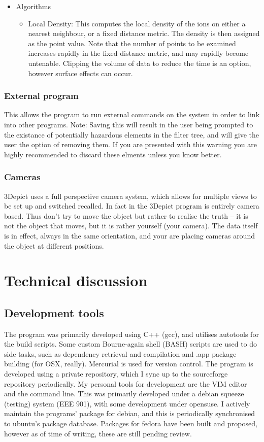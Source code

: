 \documentclass[10pt]{article}
\begin{document}
{\begin{itemize}
\item  Algorithms 
\begin{itemize}
\item Local Density: This computes the local density of the ions on either a nearest neighbour, or a fixed distance metric. The density is then assigned as the point value. Note that the number of points to be examined increases rapidly in the fixed distance metric, and may rapidly become untenable. Clipping the volume of data to reduce the time is an option, however surface effects can occur.
\end{itemize}

\end{itemize}
 
\subsubsection{ External program}
 
 This allows the program to run external commands on the system in order to link into other programs.  
 Note: Saving this will result in the user being prompted to the existance of potentially hazardous elements in the filter tree, and will give the user the option of removing them. If you are presented with this warning you are highly recommended to discard these elments unless you know better. \subsubsection{Cameras}


 3Depict uses a full perspective camera system, which allows for multiple views to be set up and switched recalled. In fact in the 3Depict program is entirely camera based. Thus don't try to move the object but rather to realise the truth -- it is not the object that moves, but it is rather yourself (your camera). The data itself is in effect, always in the same orientation, and your are placing cameras around the object at different positions.  

 \section{Technical discussion}
 \subsection{Development tools}
 The program was primarily developed using C++ (gcc), and utilises autotools for the build scripts. Some custom Bourne-again shell (BASH) scripts are used to do side tasks, such as dependency retrieval and compilation and .app package building (for OSX, really). Mercurial is used for version control. The program is developed using a private repository, which I sync up to the sourceforge repository periodically. My personal tools for development are the VIM editor and the command line.  This was primarily developed under a debian squeeze (testing) system (EEE 901), with some development under opensuse. I actively maintain the programs' package for debian, and this is periodically synchronised to ubuntu's package database. Packages for fedora have been built and proposed, however as of time of writing, these are still pending review.
 
}
\end{document}
